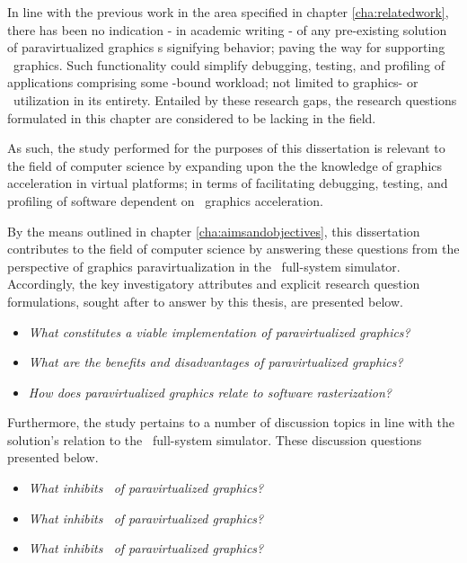 In line with the previous work in the area specified in chapter \ref{cha:relatedwork}, there has been no indication - in academic writing - of any pre-existing solution of paravirtualized graphics \dvttermapi s signifying  behavior; paving the way for supporting \dvttermreverseexecution\ graphics.
Such functionality could simplify debugging, testing, and profiling of applications comprising some \dvttermgpu -bound workload; not limited to graphics- or \dvttermgpu\ utilization in its entirety.
Entailed by these research gaps, the research questions formulated in this chapter are considered to be lacking in the field.

As such, the study performed for the purposes of this dissertation is relevant to the field of computer science by expanding upon the the knowledge of graphics acceleration in virtual platforms; in terms of facilitating debugging, testing, and profiling of software dependent on \dvttermgpu\ graphics acceleration.

By the means outlined in chapter \ref{cha:aimsandobjectives}, this dissertation contributes to the field of computer science by answering these questions from the perspective of graphics paravirtualization in the \dvttermsimics\ full-system simulator.
Accordingly, the key investigatory attributes and explicit research question formulations, sought after to answer by this thesis, are presented below.

\newcommand*\researchquestionitem[2]{\item[#1:] \textit{#2}}
\begin{itemize}[noitemsep]
	\researchquestionitem{1}{What constitutes a viable implementation of paravirtualized graphics?}
	\researchquestionitem{2}{What are the benefits and disadvantages of paravirtualized graphics?}
	\researchquestionitem{3}{How does paravirtualized graphics relate to software rasterization?}
\end{itemize}

Furthermore, the study pertains to a number of discussion topics in line with the solution's relation to the \dvttermsimics\ full-system simulator. These discussion questions presented below.

\begin{itemize}[noitemsep]
	\researchquestionitem{1}{What inhibits \dvttermdeterministicexecution\ of paravirtualized graphics?}
	\researchquestionitem{2}{What inhibits \dvttermcheckpointing\ of paravirtualized graphics?}
	\researchquestionitem{3}{What inhibits \dvttermreverseexecution\ of paravirtualized graphics?}
\end{itemize}
